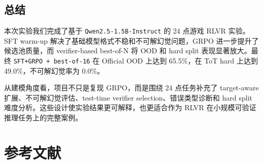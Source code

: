 \documentclass[UTF8,a4paper,12pt]{ctexart}
\begin{document}
\subsection{总结}\label{ux603bux7ed3}

本次实验我们完成了基于 \texttt{Qwen2.5-1.5B-Instruct} 的 24 点游戏 RLVR 实验。SFT warm-up 解决了基础模型格式不稳和不可解幻觉问题，GRPO 进一步提升了候选池质量，而 verifier-based best-of-N 将 OOD 和 hard split 表现显著放大。最终 \texttt{SFT+GRPO\ +\ best-of-16} 在 Official OOD 上达到 65.5\%，在 ToT hard 上达到 49.0\%，不可解幻觉率为 0.0\%。

从建模角度看，项目不只是复现 GRPO，而是围绕 24 点任务补充了 target-aware 扩展、不可解幻觉评估、test-time verifier selection、错误类型诊断和 hard split 难度分析。这些设计使实验结果更可解释，也更适合作为 RLVR 在小规模可验证推理任务上的完整案例。

\section{参考文献}\label{ux53c2ux8003ux6587ux732e}

\small
\sloppy
\end{document}
